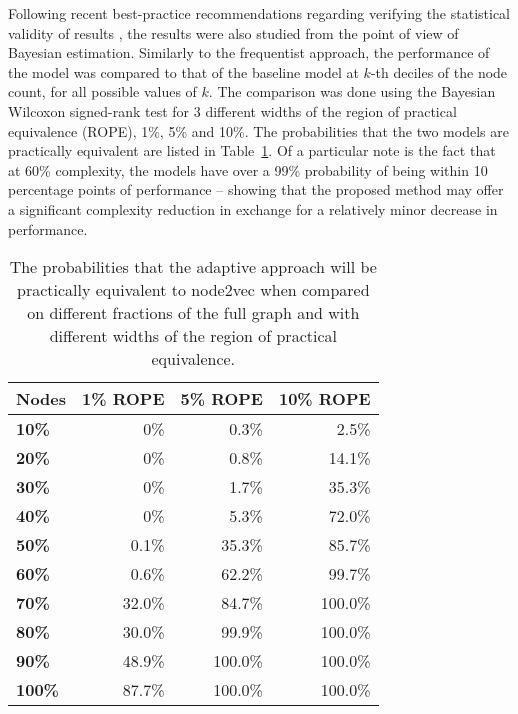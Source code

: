 Following recent best-practice recommendations regarding verifying the statistical validity of results \cite{benavoli_time_2017}, the results were also studied from the point of view of Bayesian estimation. Similarly to the frequentist approach, the performance of the model was compared to that of the baseline model at \( k \)-th deciles of the node count, for all possible values of \( k \). The comparison was done using the Bayesian Wilcoxon signed-rank test \cite{benavoli_bayesian_2014} for 3 different widths of the region of practical equivalence (ROPE), 1\%, 5\% and 10\%. The probabilities that the two models are practically equivalent are listed in Table~\ref{tab:bayesian-adaptive}. Of a particular note is the fact that at 60\% complexity, the models have over a 99\% probability of being within 10 percentage points of performance -- showing that the proposed method may offer a significant complexity reduction in exchange for a relatively minor decrease in performance.

\begin{table}
  \caption{The probabilities that the adaptive approach will be practically equivalent to node2vec when compared on different fractions of the full graph and with different widths of the region of practical equivalence.}
  \label{tab:bayesian-adaptive}
  \centering
  \begin{tabular}{lrrr}
    \toprule
    \textbf{Nodes} & \textbf{1\% ROPE} & \textbf{5\% ROPE} & \textbf{10\% ROPE} \\
    \midrule
    \textbf{10\%}  & 0\%               & 0.3\%             & 2.5\%              \\
    \textbf{20\%}  & 0\%               & 0.8\%             & 14.1\%             \\
    \textbf{30\%}  & 0\%               & 1.7\%             & 35.3\%             \\
    \textbf{40\%}  & 0\%               & 5.3\%             & 72.0\%             \\
    \textbf{50\%}  & 0.1\%             & 35.3\%            & 85.7\%             \\
    \textbf{60\%}  & 0.6\%             & 62.2\%            & 99.7\%             \\
    \textbf{70\%}  & 32.0\%            & 84.7\%            & 100.0\%            \\
    \textbf{80\%}  & 30.0\%            & 99.9\%            & 100.0\%            \\
    \textbf{90\%}  & 48.9\%            & 100.0\%           & 100.0\%            \\
    \textbf{100\%} & 87.7\%            & 100.0\%           & 100.0\%            \\
    \bottomrule
  \end{tabular}
\end{table}

